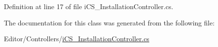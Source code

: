 Definition at line 17 of file i\+C\+S\+\_\+\+Installation\+Controller.\+cs.



The documentation for this class was generated from the following file\+:\begin{DoxyCompactItemize}
\item 
Editor/\+Controllers/\hyperlink{i_c_s___installation_controller_8cs}{i\+C\+S\+\_\+\+Installation\+Controller.\+cs}\end{DoxyCompactItemize}
